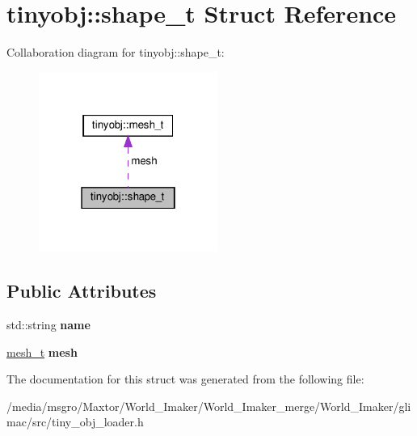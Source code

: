 \hypertarget{structtinyobj_1_1shape__t}{}\section{tinyobj\+:\+:shape\+\_\+t Struct Reference}
\label{structtinyobj_1_1shape__t}


Collaboration diagram for tinyobj\+:\+:shape\+\_\+t\+:\nopagebreak
\begin{figure}[H]
\begin{center}
\leavevmode
\includegraphics[width=166pt]{structtinyobj_1_1shape__t__coll__graph}
\end{center}
\end{figure}
\subsection*{Public Attributes}
\begin{DoxyCompactItemize}
\item 
\mbox{\label{structtinyobj_1_1shape__t_a98650e2e66d00934f68de88eafb34630}} 
std\+::string {\bfseries name}
\item 
\mbox{\label{structtinyobj_1_1shape__t_a3dacb06dfbfe9e245ff4bc7b5b3d9818}} 
\hyperlink{structtinyobj_1_1mesh__t}{mesh\+\_\+t} {\bfseries mesh}
\end{DoxyCompactItemize}


The documentation for this struct was generated from the following file\+:\begin{DoxyCompactItemize}
\item 
/media/msgro/\+Maxtor/\+World\+\_\+\+Imaker/\+World\+\_\+\+Imaker\+\_\+merge/\+World\+\_\+\+Imaker/glimac/src/tiny\+\_\+obj\+\_\+loader.\+h\end{DoxyCompactItemize}
